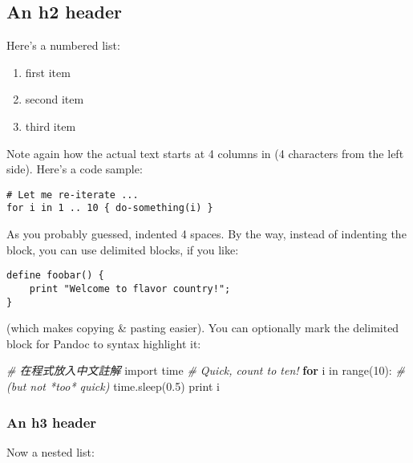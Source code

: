\documentclass[]{article}
\newenvironment{Shaded}{}{}
\newcommand{\KeywordTok}[1]{\textcolor[rgb]{0.00,0.44,0.13}{\textbf{{#1}}}}
\newcommand{\DataTypeTok}[1]{\textcolor[rgb]{0.56,0.13,0.00}{{#1}}}
\newcommand{\DecValTok}[1]{\textcolor[rgb]{0.25,0.63,0.44}{{#1}}}
\newcommand{\FloatTok}[1]{\textcolor[rgb]{0.25,0.63,0.44}{{#1}}}
\newcommand{\CharTok}[1]{\textcolor[rgb]{0.25,0.44,0.63}{{#1}}}
\newcommand{\CommentTok}[1]{\textcolor[rgb]{0.38,0.63,0.69}{\textit{{#1}}}}
\newcommand{\NormalTok}[1]{{#1}}
\begin{document}
\subsection{An h2 header}\label{an-h2-header}

Here's a numbered list:

\begin{enumerate}
\def\labelenumi{\arabic{enumi}.}
\itemsep1pt\parskip0pt
\item
  first item
\item
  second item
\item
  third item
\end{enumerate}

Note again how the actual text starts at 4 columns in (4 characters from
the left side). Here's a code sample:

\begin{verbatim}
# Let me re-iterate ...
for i in 1 .. 10 { do-something(i) }
\end{verbatim}

As you probably guessed, indented 4 spaces. By the way, instead of
indenting the block, you can use delimited blocks, if you like:

\begin{verbatim}
define foobar() {
    print "Welcome to flavor country!";
}
\end{verbatim}

(which makes copying \& pasting easier). You can optionally mark the
delimited block for Pandoc to syntax highlight it:

\begin{Shaded}
\begin{Highlighting}[]
\CommentTok{# 在程式放入中文註解}
\CharTok{import} \NormalTok{time}
\CommentTok{# Quick, count to ten!}
\KeywordTok{for} \NormalTok{i in }\DataTypeTok{range}\NormalTok{(}\DecValTok{10}\NormalTok{):}
    \CommentTok{# (but not *too* quick)}
    \NormalTok{time.sleep(}\FloatTok{0.5}\NormalTok{)}
    \DataTypeTok{print} \NormalTok{i}
\end{Highlighting}
\end{Shaded}

\subsubsection{An h3 header}\label{an-h3-header}

Now a nested list:
\end{document}
